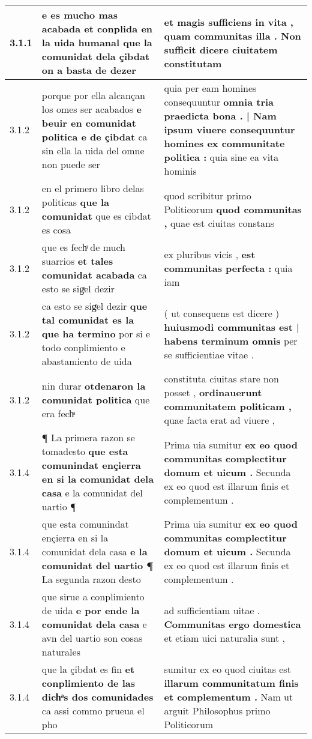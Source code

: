 \begin{tabular}{|p{1cm}|p{6.5cm}|p{6.5cm}|}
3.1.1 & e es mucho mas acabada et conplida en la uida humanal \textbf{ que la comunidat dela çibdat } on a basta de dezer & et magis sufficiens in vita , \textbf{ quam communitas illa . } Non sufficit dicere ciuitatem constitutam \\\hline
3.1.2 & porque por ella alcançan los omes ser acabados \textbf{ e beuir en comunidat politica e de çibdat } ca sin ella la uida del omne non puede ser & quia per eam homines consequuntur \textbf{ omnia tria praedicta bona . | Nam ipsum viuere consequuntur homines ex communitate politica : } quia sine ea vita hominis \\\hline
3.1.2 & en el primero libro delas politicas \textbf{ que la comunidat } que es cibdat es cosa & quod scribitur primo Politicorum \textbf{ quod communitas , } quae est ciuitas constans \\\hline
3.1.2 & que es fechͣ de much suarrios \textbf{ et tales comunidat acabada } ca esto se sigͤel dezir & ex pluribus vicis , \textbf{ est communitas perfecta : } quia iam \\\hline
3.1.2 & ca esto se sigͤel dezir \textbf{ que tal comunidat es la que ha termino } por si e todo conplimiento e abastamiento de uida & ( ut consequens est dicere ) \textbf{ huiusmodi communitas est | habens terminum omnis } per se sufficientiae vitae . \\\hline
3.1.2 & nin durar \textbf{ otdenaron la comunidat politica } que era fechͣ & constituta ciuitas stare non posset , \textbf{ ordinauerunt communitatem politicam , } quae facta erat ad viuere , \\\hline
3.1.4 & ¶ La primera razon se tomadesto \textbf{ que esta comunindat ençierra en si la comunidat dela casa } e la comunidat del uartio ¶ & Prima uia sumitur \textbf{ ex eo quod communitas complectitur domum et uicum . } Secunda ex eo quod est illarum finis et complementum . \\\hline
3.1.4 & que esta comunindat ençierra en si la comunidat dela casa \textbf{ e la comunidat del uartio ¶ } La segunda razon desto & Prima uia sumitur \textbf{ ex eo quod communitas complectitur domum et uicum . } Secunda ex eo quod est illarum finis et complementum . \\\hline
3.1.4 & que sirue a conplimiento de uida \textbf{ e por ende la comunidat dela casa } e avn del uartio son cosas naturales & ad sufficientiam uitae . \textbf{ Communitas ergo domestica } et etiam uici naturalia sunt , \\\hline
3.1.4 & que la çibdat es fin \textbf{ et conplimiento de las dichͣs dos comunidades } ca assi commo prueua el pho & sumitur ex eo quod ciuitas est \textbf{ illarum communitatum finis et complementum . } Nam ut arguit Philosophus primo Politicorum \\\hline

\end{tabular}

